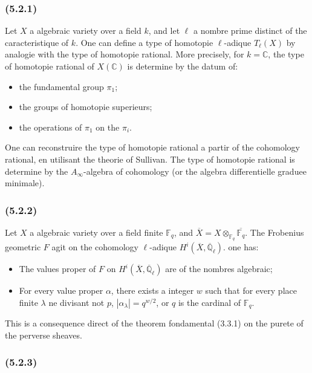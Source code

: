 \documentclass[12pt,a4paper]{article}
\theoremstyle{plain}
\theoremstyle{definition}
\theoremstyle{remark}
\newcommand{\bbC}{\mathbb{C}}
\newcommand{\Qlb}{\overline{\mathbb{Q}}_\ell}
\newcommand{\Fqt}{\mathbb{F}_q}
\begin{document}
\subsubsection*{\textup{(5.2.1)}}

Let $X$ a algebraic variety over a field $k$, and let $\ell$ a nombre prime distinct of the caracteristique of $k$. One can define a type of homotopie $\ell$-adique $T_\ell(X)$ by analogie with the type of homotopie rational. More precisely, for $k = \bbC$, the type of homotopie rational of $X(\bbC)$ is determine by the datum of:
\begin{itemize}
\item[(i)] the fundamental group $\pi_1$;
\item[(ii)] the groups of homotopie superieurs;
\item[(iii)] the operations of $\pi_1$ on the $\pi_i$.
\end{itemize}

One can reconstruire the type of homotopie rational a partir of the cohomology rational, en utilisant the theorie of Sullivan. The type of homotopie rational is determine by the $A_\infty$-algebra of cohomology (or the algebra differentielle graduee minimale).

\subsubsection*{\textup{(5.2.2)}}

Let $X$ a algebraic variety over a field finite $\Fqt$, and $\overline{X} = X \otimes_{\Fqt} \overline{\Fqt}$. The Frobenius geometric $F$ agit on the cohomology $\ell$-adique $H^i(\overline{X}, \Qlb)$. one has:
\begin{itemize}
\item[(i)] The values proper of $F$ on $H^i(\overline{X}, \Qlb)$ are of the nombres algebraic;
\item[(ii)] For every value proper $\alpha$, there exists a integer $w$ such that for every place finite $\lambda$ ne divisant not $p$, $|\alpha_\lambda| = q^{w/2}$, or $q$ is the cardinal of $\Fqt$.
\end{itemize}

This is a consequence direct of the theorem fondamental (3.3.1) on the purete of the perverse sheaves.

\subsubsection*{\textup{(5.2.3)}}
\end{document}
